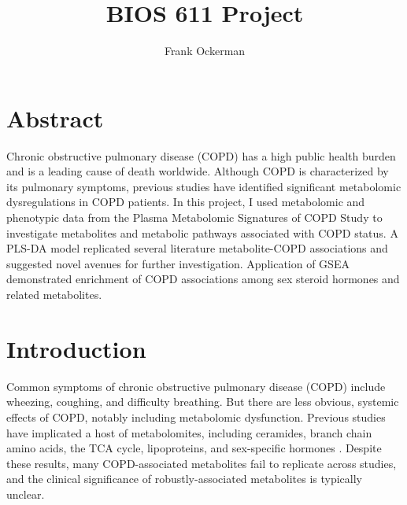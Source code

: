 \documentclass{article}
\begin{document}
\author{Frank Ockerman}
\title{BIOS 611 Project}
\maketitle
\tableofcontents

\section*{Abstract}
Chronic obstructive pulmonary disease (COPD) has a high public health burden and is a leading cause of death worldwide. Although COPD is characterized by its pulmonary symptoms, previous studies have identified significant metabolomic dysregulations in COPD patients. In this project, I used metabolomic and phenotypic data from the Plasma Metabolomic Signatures of COPD Study to investigate metabolites and metabolic pathways associated with COPD status. A PLS-DA model replicated several literature metabolite-COPD associations and suggested novel avenues for further investigation. Application of GSEA demonstrated enrichment of COPD associations among sex steroid hormones and related metabolites.


\section*{Introduction}
Common symptoms of chronic obstructive pulmonary disease (COPD) include wheezing, coughing, and difficulty breathing. But there are less obvious, systemic effects of COPD, notably including metabolomic dysfunction. Previous studies have implicated a host of metabolomites, including ceramides, branch chain amino acids, the TCA cycle, lipoproteins, and sex-specific hormones \cite{godboleMetabolomeFeaturesCOPD2022}\cite{tamRoleFemaleHormones2011}. Despite these results, many COPD-associated metabolites fail to replicate across studies, and the clinical significance of robustly-associated metabolites is typically unclear.
\end{document}
